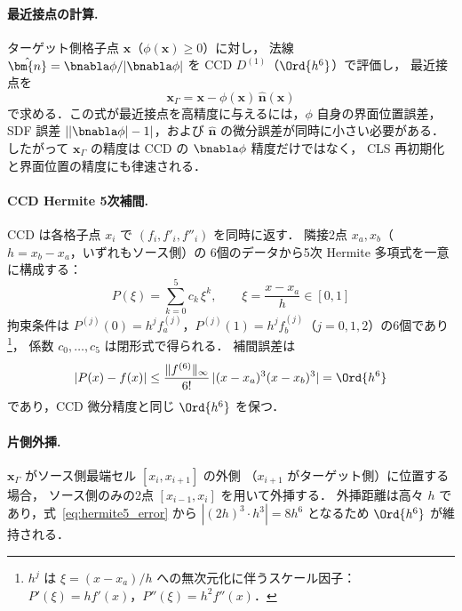 \paragraph{最近接点の計算.}
ターゲット側格子点 $\bm{x}$（$\phi(\bm{x}) \geq 0$）に対し，
法線 $\hat{\bm{n}} = \bnabla\phi/|\bnabla\phi|$ を CCD $D^{(1)}$（$\Ord{h^6}$）で評価し，
最近接点を
\begin{equation}
  \bm{x}_\Gamma = \bm{x} - \phi(\bm{x})\,\hat{\bm{n}}(\bm{x})
  \label{eq:closest_point}
\end{equation}
で求める．この式が最近接点を高精度に与えるには，$\phi$ 自身の界面位置誤差，
SDF 誤差 $||\bnabla\phi|-1|$，および $\hat{\bm n}$ の微分誤差が同時に小さい必要がある．
したがって $\bm{x}_\Gamma$ の精度は CCD の $\bnabla\phi$ 精度だけではなく，
CLS 再初期化と界面位置の精度にも律速される．

\paragraph{CCD Hermite 5次補間.}
CCD は各格子点 $x_i$ で $(f_i, f'_i, f''_i)$ を同時に返す．
隣接2点 $x_a, x_b$（$h = x_b - x_a$，いずれもソース側）の
6個のデータから5次 Hermite 多項式を一意に構成する：
\begin{equation}
  P(\xi) = \sum_{k=0}^{5} c_k \,\xi^k, \qquad \xi = \frac{x - x_a}{h} \in [0,1]
  \label{eq:hermite5}
\end{equation}
拘束条件は $P^{(j)}(0) = h^j f_a^{(j)}$，$P^{(j)}(1) = h^j f_b^{(j)}$（$j = 0,1,2$）の6個であり%
\footnote{$h^j$ は $\xi = (x-x_a)/h$ への無次元化に伴うスケール因子：
$P'(\xi) = h f'(x)$，$P''(\xi) = h^2 f''(x)$．}，
係数 $c_0,\ldots,c_5$ は閉形式で得られる．
補間誤差は
\begin{equation}
  |P(x) - f(x)| \leq \frac{\|f^{(6)}\|_\infty}{6!}\,|(x-x_a)^3(x-x_b)^3| = \Ord{h^6}
  \label{eq:hermite5_error}
\end{equation}
であり，CCD 微分精度と同じ $\Ord{h^6}$ を保つ．

\paragraph{片側外挿.}
$\bm{x}_\Gamma$ がソース側最端セル $[x_i, x_{i+1}]$ の外側
（$x_{i+1}$ がターゲット側）に位置する場合，
ソース側のみの2点 $[x_{i-1}, x_i]$ を用いて外挿する．
外挿距離は高々 $h$ であり，式~\eqref{eq:hermite5_error} から
$|(2h)^3 \cdot h^3| = 8h^6$ となるため $\Ord{h^6}$ が維持される．

